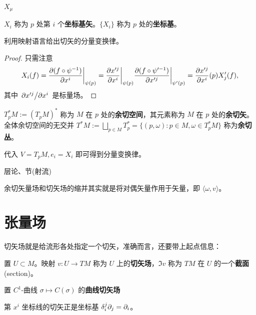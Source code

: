 $X_\mu$

\begin{definition}
    $X_i$ 称为 $p$ 处第 $i$ 个\textbf{坐标基矢}。$\{X_i\}$ 称为 $p$ 处的\textbf{坐标基}。
\end{definition}

\begin{theorem}
    利用映射语言给出切矢的分量变换律。
\end{theorem}
\begin{proof}只需注意
    \[
    X_i(f)=\pdv{(f\circ\psi^{-1})}{x^i}\bigg|_{\psi(p)}=\pdv{x'^j}{x^i}\bigg|_{\psi(p)}\pdv{(f\circ\psi'^{-1})}{x'^j}\bigg|_{\psi'(p)}={\pdv{x'^j}{x^i}}(p)X'_j(f),
    \]
其中 $\pdv*{x'^j}{x^i}$ 是标量场。
\end{proof}

\begin{definition}
    $T^*_p M:=(T_p M)^*$ 称为 $M$ 在 $p$ 处的\textbf{余切空间}，其元素称为 $M$ 在 $p$ 处的\textbf{余切矢}。
    全体余切空间的无交并 $T^*M:=\bigsqcup_{p\in M} T^*_p=\{(p,\omega):p\in M,\omega\in T^*_p M\}$ 称为\textbf{余切丛}。
\end{definition}

代入 $V=T_p M,e_i=X_i$ 即可得到分量变换律。

层论、节(射流)

余切矢量场和切矢场的缩并其实就是将对偶矢量作用于矢量，即
$\langle \omega, v\rangle$。

\section{张量场}

切矢场就是给流形各处指定一个切矢，准确而言，还要带上起点信息：
\begin{definition}
    置 $U\subset M$。映射 $v:U\to TM$ 称为 $U$  上的\textbf{切矢场}，$\Im v$ 称为 $TM$ 在 $U$ 的一个\textbf{截面}(section)。
\end{definition}

\begin{definition}
    置 $C^1$-曲线 $\sigma\mapsto C(\sigma)$ 的\textbf{曲线切矢场}
\end{definition}

\begin{eg}
    第 $x^i$ 坐标线的切矢正是坐标基 $\delta^j_i\partial_j=\partial_i$。
\end{eg}

